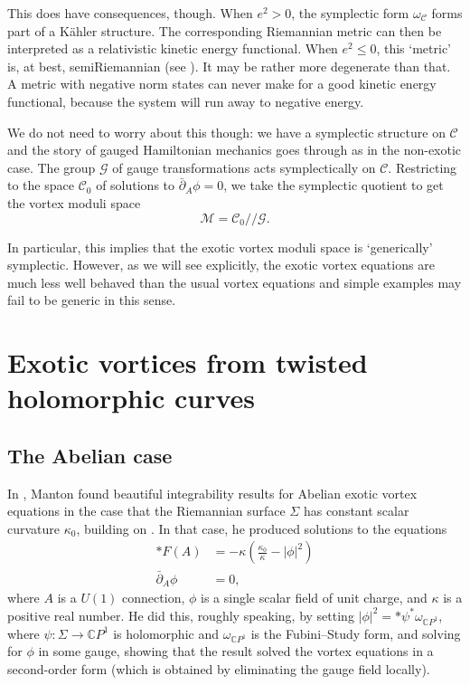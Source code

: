 \documentclass[10pt]{article}
\newcommand{\mc}[1]{\mathcal{#1}}
\newcommand{\db}{\bar{\partial}}
\theoremstyle{definition}
\begin{document}
This does have consequences, though. When \(e^2 > 0\), the symplectic form \(\omega_\mc{C}\) forms part of a K\"ahler structure. The corresponding Riemannian metric can then be interpreted as a relativistic kinetic energy functional. When \(e^2 \leq 0\), this `metric' is, at best, semiRiemannian (see \cite{mantonFVE,contattoMF}). It may be rather more degenerate than that. A metric with negative norm states can never make for a good kinetic energy functional, because the system will run away to negative energy.

We do not need to worry about this though: we have a symplectic structure on \(\mc{C}\) and the story of gauged Hamiltonian mechanics goes through as in the non-exotic case. The group \(\mc{G}\) of gauge transformations acts symplectically on \(\mc{C}\). Restricting to the space \(\mc{C}_0\) of solutions to \(\db_A \phi = 0\), we take the symplectic quotient to get the vortex moduli space
\[
\mc{M} = \mc{C}_0//\mc{G} \text{.}
\]

In particular, this implies that the exotic vortex moduli space is `generically' symplectic. However, as we will see explicitly, the exotic vortex equations are much less well behaved than the usual vortex equations and simple examples may fail to be generic in this sense. 


\section{Exotic vortices from twisted holomorphic curves}
\label{sec:thc}

\subsection{The Abelian case}

In \cite{mantonPV,mantonFVE}, Manton found beautiful integrability results for Abelian exotic vortex equations in the case that the Riemannian surface \(\Sigma\) has constant scalar curvature \(\kappa_0\), building on \cite{wittenMPS,popovIV}. In that case, he produced solutions to the equations 
\begin{align*}
*F(A) &= -\kappa\left(\frac{\kappa_0}{\kappa} - |\phi|^2\right) \\ 	\db_A \phi & =0 \text{,}
\end{align*}
where \(A\) is a \(U(1)\) connection, \(\phi\) is a single scalar field of unit charge, and \(\kappa\) is a positive real number. He did this, roughly speaking, by setting \(|\phi|^2 = *\psi^*\omega_{\mathbb{C}P^1}\), where \(\psi : \Sigma \to \mathbb{C}P^1\) is holomorphic and \(\omega_{\mathbb{C}P^1}\) is the Fubini--Study form, and solving for \(\phi\) in some gauge, showing that the result solved the vortex equations in a second-order form (which is obtained by eliminating the gauge field locally).
\end{document}
